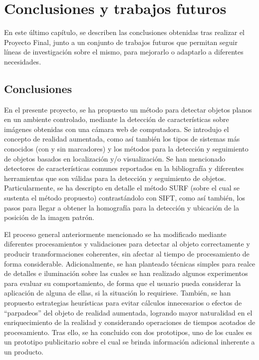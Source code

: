 \chapter{Conclusiones y trabajos futuros}
\label{c:conclusiones}
\vspace{1cm}
En este último capítulo, se describen las conclusiones obtenidas tras realizar el Proyecto Final, junto a un conjunto de trabajos futuros que permitan seguir líneas de investigación sobre el mismo, para mejorarlo o adaptarlo a diferentes necesidades.
\section{Conclusiones}
En el presente proyecto, se ha propuesto un método para detectar objetos planos en un ambiente controlado, mediante la detección de
características sobre imágenes obtenidas con una cámara web de computadora. Se introdujo el concepto de realidad aumentada, como así también los tipos de sistemas más conocidos (con y sin marcadores) y los métodos para la detección y seguimiento de objetos basados en localización y/o visualización. Se han mencionado detectores de características comunes reportados en la bibliografía y diferentes herramientas que son válidas para la detección y seguimiento de objetos. Particularmente, se ha descripto en detalle el método SURF (sobre el cual se sustenta el método propuesto) contrastándolo con SIFT, como así también, los pasos para llegar a obtener la homografía para la detección y ubicación de la posición de la imagen patrón.

El proceso general anteriormente mencionado se ha modificado mediante diferentes procesamientos y validaciones para detectar al objeto correctamente y producir transformaciones coherentes, sin afectar al tiempo de procesamiento de forma considerable. Adicionalmente, se han planteado técnicas simples para realce de detalles e iluminación sobre las cuales se han realizado algunos experimentos para evaluar su comportamiento, de forma que el usuario pueda considerar la aplicación de alguna de ellas, si la situación lo requiriese. También, se han propuesto estrategias heurísticas para evitar cálculos innecesarios o efectos de ``parpadeos'' del objeto de realidad aumentada, logrando mayor naturalidad en el enriquecimiento de la realidad y considerando operaciones de tiempos acotados de procesamiento. Tras ello, se ha concluido con dos prototipos, uno de los cuales es un prototipo publicitario sobre el cual se brinda información adicional inherente a un producto.

